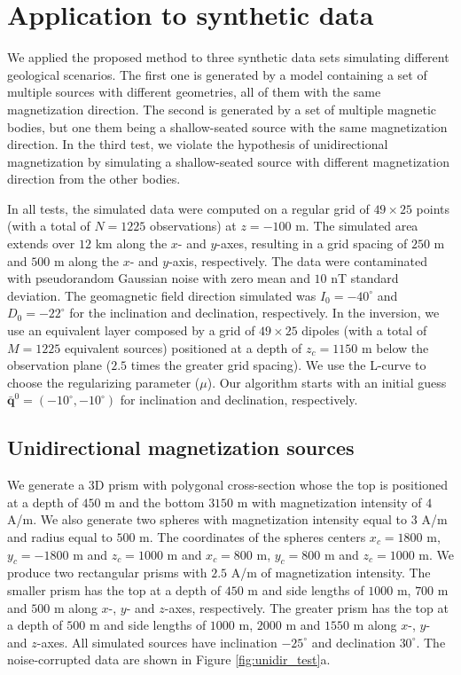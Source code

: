 \section{Application to synthetic data}
\label{sec:synt_tests}

We applied the proposed method to three synthetic data sets simulating different geological scenarios. The first one is generated by a model containing a set of multiple sources with different geometries, all of them with the same magnetization direction. The second is generated by a set of multiple magnetic bodies, but one them being a shallow-seated source with the same magnetization direction. In the third test, we violate the hypothesis of unidirectional magnetization by simulating a shallow-seated source with different magnetization direction from the other bodies.

In all tests, the simulated data were computed on a regular grid of $49 \times 25$ points (with a total of $N = 1225$ observations) at $z = -100$ m.  The simulated 
area extends over $12$ km along the $x$- and $y$-axes, resulting in a grid spacing of $250$ m and $500$ m along the $x$- and $y$-axis, respectively. The data were contaminated with pseudorandom Gaussian noise with zero mean and $10$ nT standard deviation. The geomagnetic field direction simulated was $I_0 = -40^\circ$ and $D_0 = -22^\circ$ for the inclination and declination, respectively. In the inversion, we use an equivalent layer composed by a grid of $49 \times 25$ dipoles (with a total of $M = 1225$ equivalent sources) positioned at a depth of $z_c = 1150$ m below the observation plane ($2.5$ times the greater grid spacing). We use the L-curve to choose the regularizing parameter ($\mu$). Our algorithm starts with an initial guess $\bar{\mathbf{q}}^{0} = (-10^\circ,-10^\circ)$ for inclination and declination, respectively.

\subsection{Unidirectional magnetization sources}
 
We generate a 3D prism with polygonal cross-section whose the top is positioned at a depth of $450$ m and the bottom $3150$ m with magnetization intensity of $4$ A/m. We also generate two spheres with magnetization intensity equal to $3$ A/m and radius equal to $500$ m. The coordinates of the spheres centers $x_c = 1800$ m, $y_c = -1800$ m and $z_c = 1000$ m and $x_c = 800$ m, $y_c = 800$ m and $z_c= 1000$ m. We produce two rectangular prisms with $2.5$ A/m of magnetization intensity. The smaller prism has the top at a depth of $450$ m and side lengths of $1000$ m, $700$ m and $500$ m along $x$-, $y$- and $z$-axes, respectively. The greater prism has the top at a depth of $500$ m and side lengths of $1000$ m, $2000$ m and $1550$ m along $x$-, $y$- and $z$-axes. All simulated sources have inclination $-25^\circ$ and declination $30^\circ$. The noise-corrupted data are shown in Figure \ref{fig:unidir_test}a. 

